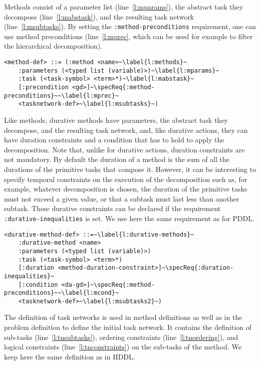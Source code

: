 \documentclass[letterpaper]{article} %
\begin{document}
%
%
Methods consist of a parameter list (line~\ref{l:mparams}), the abstract task they decompose (line~\ref{l:mabstask}), and the resulting task network (line~\ref{l:msubtasks}). By setting the \verb+:method-preconditions+ requirement, one can use method preconditions (line~\ref{l:mprec}, which can be used for example to filter the hierarchical decomposition).

\begin{lstlisting}[firstnumber=last, escapechar=~]
<method-def> ::= (:method <name>~\label{l:methods}~
    :parameters (<typed list (variable)>)~\label{l:mparams}~
    :task (<task-symbol> <term>*)~\label{l:mabstask}~
    [:precondition <gd>]~\specReq{:method-preconditions}~~\label{l:mprec}~
    <tasknetwork-def>~\label{l:msubtasks}~)
\end{lstlisting}

%
%
Like methods, durative methods have parameters, the abstract task they decompose, and the resulting task network, and, like durative actions, they can have duration constraints and a condition that has to hold to apply the decomposition. Note that, unlike for durative actions, duration constraints are not mandatory. By default the duration of a method is the sum of all the durations of the primitive tasks that compose it. However, it can be interesting to specify temporal constraints on the execution of the decomposition such as, for example, whatever decomposition is chosen, the duration of the primitive tasks must not exceed a given value, or that a subtask must last less than another subtask. These durative constraints can be declared if the requirement {\tt :durative-inequalities} is set. We use here the same requirement as for PDDL.

\begin{lstlisting}[firstnumber=last, escapechar=~]
<durative-method-def> ::=~\label{l:durative-methods}~
    :durative-method <name>
    :parameters (<typed list (variable)>)
    :task (<task-symbol> <term>*)
    [:duration <method-duration-constraint>]~\specReq{:duration-inequalities}~
    [:condition <da-gd>]~\specReq{:method-preconditions}~~\label{l:mcond}~
    <tasknetwork-def>~\label{l:msubtasks2}~)
\end{lstlisting}

%
%
The definition of task networks is used in method definitions as well as in the problem definition to define the initial task network. It contains the definition of sub-tasks (line~\ref{l:tnsubtasks}), ordering constraints (line~\ref{l:tnordering}), and logical constraints (line~\ref{l:tnconstraints}) on the sub-tasks of the method. We keep here the same definition as in HDDL.
\end{document}
